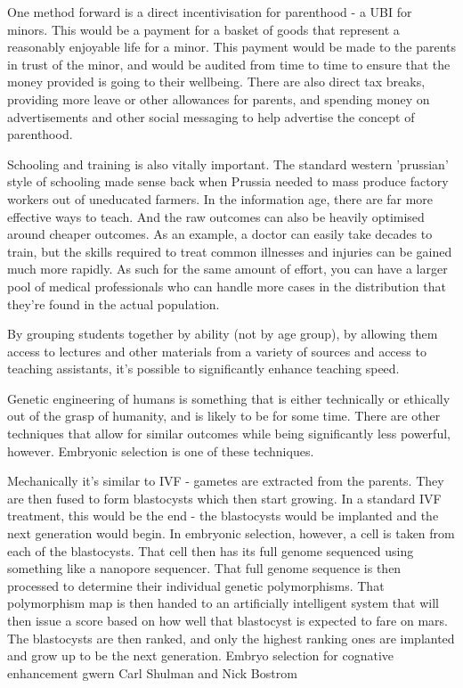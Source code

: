 \documentclass[10pt]{article}
\begin{document}
One method forward is a direct incentivisation for parenthood - a UBI for minors. This would be a payment for a basket of goods that represent a reasonably enjoyable life for a minor. This payment would be made to the parents in trust of the minor, and would be audited from time to time to ensure that the money provided is going to their wellbeing. There are also direct tax breaks, providing more leave or other allowances for parents, and spending money on advertisements and other social messaging to help advertise the concept of parenthood.

Schooling and training is also vitally important. The standard western 'prussian' style of schooling made sense back when Prussia needed to mass produce factory workers out of uneducated farmers. In the information age, there are far more effective ways to teach. And the raw outcomes can also be heavily optimised around cheaper outcomes. As an example, a doctor can easily take decades to train, but the skills required to treat common illnesses and injuries can be gained much more rapidly. As such for the same amount of effort, you can have a larger pool of medical professionals who can handle more cases in the distribution that they're found in the actual population.

By grouping students together by ability (not by age group), by allowing them access to lectures and other materials from a variety of sources and access to teaching assistants, it's possible to significantly enhance teaching speed.

Genetic engineering of humans is something that is either technically or ethically out of the grasp of humanity, and is likely to be for some time. There are other techniques that allow for similar outcomes while being significantly less powerful, however. Embryonic selection is one of these techniques.

Mechanically it's similar to IVF - gametes are extracted from the parents. They are then fused to form blastocysts which then start growing. In a standard IVF treatment, this would be the end - the blastocysts would be implanted and the next generation would begin. In embryonic selection, however, a cell is taken from each of the blastocysts. That cell then has its full genome sequenced using something like a nanopore sequencer. That full genome sequence is then processed to determine their individual genetic polymorphisms. That polymorphism map is then handed to an artificially intelligent system that will then issue a score based on how well that blastocyst is expected to fare on mars. The blastocysts are then ranked, and only the highest ranking ones are implanted and grow up to be the next generation. 
Embryo selection for cognative enhancement gwern Carl Shulman and Nick Bostrom
\end{document}
